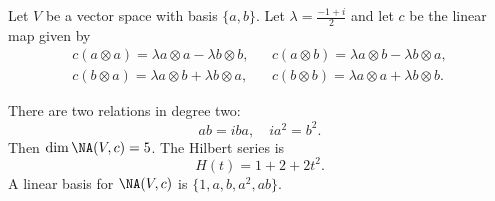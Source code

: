\begin{example}[Rowell]
Let $V$ be a vector space with basis $\{a,b\}$. Let
$\lambda=\frac{-1+i}{2}$ and let $c$ be the linear map given by
\begin{align*}
c(a\otimes a)=\lambda a\otimes a-\lambda b\otimes b, && 
c(a\otimes b)=\lambda a\otimes b-\lambda b\otimes a,\\
c(b\otimes a)=\lambda a\otimes b+\lambda b\otimes a, &&
c(b\otimes b)=\lambda a\otimes a+\lambda b\otimes b.
\end{align*}

There are two relations in degree two:
\[
	ab=iba,\quad
	ia^2=b^2.
\]
Then $\dim\NA(V,c)=5$. The Hilbert series is 
\[
    H(t)=1+2+2t^2.
\]
A linear basis for $\NA(V,c)$ is $\{1,a,b,a^2,ab\}$. 
\end{example}

